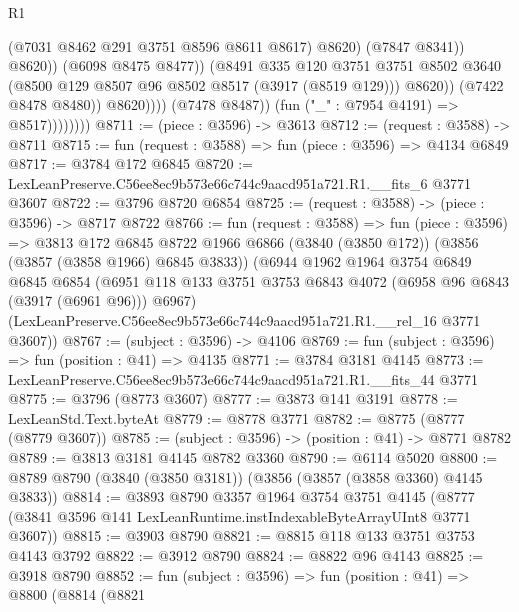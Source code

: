 \begin{lexlean}{R1}
\begin{coremodule}
                                          (@7031 @8462 @291 @3751 @8596 @8611 @8617)
                                          @8620)
                                        (@7847 @8341))
                                      @8620))
                                  (@6098 @8475 @8477))
                                (@8491
                                  @335
                                  @120
                                  @3751
                                  @3751
                                  @8502
                                  @3640
                                  (@8500 @129 @8507 @96 @8502 @8517 (@3917 (@8519 @129)))
                                  @8620))
                              (@7422 @8478 @8480))
                            @8620))))
                    (@7478 @8487))
                  (fun ("_" : @7954 @4191) => @8517))))))))
@8711 := (piece : @3596) -> @3613
@8712 := (request : @3588) -> @8711
@8715 := fun (request : @3588) => fun (piece : @3596) => @4134 @6849
@8717 := @3784 @172 @6845
@8720 := LexLeanPreserve.C56ee8ec9b573e66c744c9aacd951a721.R1.__fits_6 @3771 @3607
@8722 := @3796 @8720 @6854
@8725 := (request : @3588) -> (piece : @3596) -> @8717 @8722
@8766 := fun (request : @3588) =>
  fun (piece : @3596) =>
  @3813
    @172
    @6845
    @8722
    @1966
    @6866
    (@3840 (@3850 @172))
    (@3856 (@3857 (@3858 @1966) @6845 @3833))
    (@6944
      @1962
      @1964
      @3754
      @6849
      @6845
      @6854
      (@6951 @118 @133 @3751 @3753 @6843 @4072 (@6958 @96 @6843 (@3917 (@6961 @96))) @6967)
      (LexLeanPreserve.C56ee8ec9b573e66c744c9aacd951a721.R1.__rel_16 @3771 @3607))
@8767 := (subject : @3596) -> @4106
@8769 := fun (subject : @3596) => fun (position : @41) => @4135
@8771 := @3784 @3181 @4145
@8773 := LexLeanPreserve.C56ee8ec9b573e66c744c9aacd951a721.R1.__fits_44 @3771
@8775 := @3796 (@8773 @3607)
@8777 := @3873 @141 @3191
@8778 := LexLeanStd.Text.byteAt
@8779 := @8778 @3771
@8782 := @8775 (@8777 (@8779 @3607))
@8785 := (subject : @3596) -> (position : @41) -> @8771 @8782
@8789 := @3813 @3181 @4145 @8782 @3360
@8790 := @6114 @5020
@8800 := @8789 @8790 (@3840 (@3850 @3181)) (@3856 (@3857 (@3858 @3360) @4145 @3833))
@8814 := @3893
    @8790
    @3357
    @1964
    @3754
    @3751
    @4145
    (@8777 (@3841 @3596 @141 LexLeanRuntime.instIndexableByteArrayUInt8 @3771 @3607))
@8815 := @3903 @8790
@8821 := @8815 @118 @133 @3751 @3753 @4143 @3792
@8822 := @3912 @8790
@8824 := @8822 @96 @4143
@8825 := @3918 @8790
@8852 := fun (subject : @3596) =>
  fun (position : @41) =>
  @8800
    (@8814
      (@8821

\end{coremodule}
\end{lexlean}
